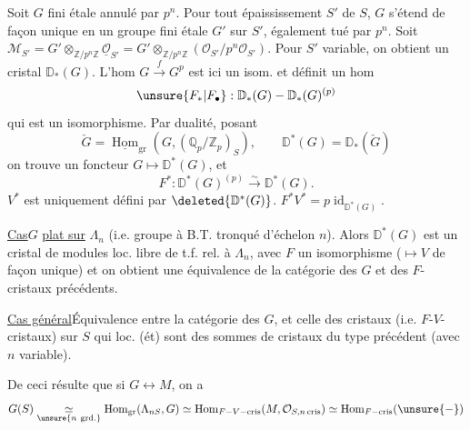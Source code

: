 Soit $G$ fini étale annulé par $p^n$. Pour tout épaississement
$S'$ de $S$, $G$ s'étend de façon unique en un groupe fini étale
$G'$ sur $S'$, également tué par $p^n$. Soit
$\mathcal M_{S'}=G'\otimes_{\mathbb Z/p^n\mathbb Z}
\underline{\mathcal O}_{S'}
=G'\otimes_{\mathbb Z/p^n\mathbb Z}
(\mathcal O_{S'}/p^n\mathcal O_{S'})$.
Pour $S'$ variable, on obtient un cristal $\mathbb D_*(G)$.
L'hom $G\xrightarrow{f}G^p$ est ici un isom. et définit un hom
\[
\unsure{F_*|F_\bullet}:\mathbb D_*(G)-\mathbb D_*(G)^{(p)}
\]
qui est un isomorphisme. Par dualité, posant
\[
\check G=\underline{\operatorname{Hom}}_{\mathrm{gr}}
(G,(\mathbb Q_p/\mathbb Z_p)_S),\qquad
\mathbb D^*(G)=\mathbb D_*(\check G)
\]
on trouve un foncteur $G\longmapsto\mathbb D^*(G)$,
et
\[
F^*:\mathbb D^*(G)^{(p)}\xrightarrow{\sim}\mathbb D^*(G).
\]
$V^*$ est uniquement défini par $\deleted{\mathbb D^*(G)}$.
$F^*V^*=p\operatorname{id}_{\mathbb D^*(G)}$.


\uline{Cas}\quad $G$ \uline{plat sur} $\Lambda_n$
(i.e. groupe à B.T. tronqué d'échelon $n$).
Alors $\mathbb D^*(G)$ est un cristal de modules loc. libre de t.f.
rel. à $\Lambda_n$, \unsure{\&} avec $F$ 
un isomorphisme ($\mapsto V$ de façon unique) et on obtient une
équivalence de la catégorie des
 $G$ et des $F$-cristaux précédents.

\uline{Cas général}\quad {}Équivalence entre la catégorie
des $G$, et celle des cristaux
(i.e. $F$-$V$-cristaux) sur $S$ qui loc. (ét) sont des sommes de
cristaux du type précédent (avec $n$ variable).

De ceci résulte que si $G\longleftrightarrow M$, on a
\[
G(S)\underset{\unsure{n\ \mathrm{grd.}}}{\simeq}
\operatorname{Hom}_{\mathrm{gr}}(\Lambda_{nS},G)
\simeq\operatorname{Hom}_{F-V-\mathrm{cris}}
(M,\mathcal O_{S,n\,\mathrm{cris}})
\simeq\operatorname{Hom}_{F-\mathrm{cris}}(\unsure{-})
\]

